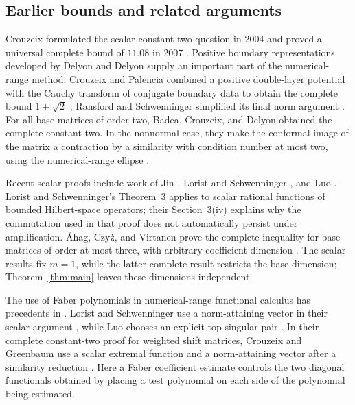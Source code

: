 \documentclass[11pt]{article}
\theoremstyle{remark}\newtheorem{remark}[theorem]{Remark}
\numberwithin{equation}{section}
\begin{document}
\subsection*{Earlier bounds and related arguments}
Crouzeix formulated the scalar constant-two question in 2004 and proved a
universal complete bound of $11.08$ in 2007
\cite{Crouzeix2004,Crouzeix2007}.
Positive boundary representations developed by Delyon and Delyon
\cite{DelyonDelyon1999} supply an important part of the numerical-range
method. Crouzeix and Palencia combined a positive double-layer potential
with the Cauchy transform of conjugate boundary data to obtain the
complete bound $1+\sqrt2$ \cite{CrouzeixPalencia2017}; Ransford and
Schwenninger simplified its final norm argument
\cite{RansfordSchwenninger2018}.
For all base matrices of order two, Badea, Crouzeix, and Delyon obtained
the complete constant two. In the nonnormal case, they make the conformal
image of the matrix a contraction by a similarity with condition number at
most two, using the numerical-range ellipse \cite{BadeaCrouzeixDelyon2006}.

Recent scalar proofs include work of Jin \cite{Jin2026},
Lorist and Schwenninger \cite{LoristSchwenninger2026}, and Luo
\cite{Luo2026}.
Lorist and Schwenninger's Theorem~3 applies to scalar rational functions
of bounded Hilbert-space operators; their Section~3(iv) explains why the
commutation used in that proof does not automatically persist under
amplification. \AA hag, Czy{\.{z}}, and Virtanen prove the complete
inequality for base matrices of order at most three, with arbitrary
coefficient dimension \cite[Theorem~1.1]{AhagCzyzVirtanen2026}.
The scalar results fix $m=1$, while the latter complete result restricts
the base dimension; Theorem~\ref{thm:main} leaves these dimensions independent.

The use of Faber polynomials in numerical-range functional calculus has
precedents in \cite{Beckermann2005,BeckermannCrouzeix2014}.
Lorist and Schwenninger use a norm-attaining vector in their scalar
argument \cite[Lemma~1]{LoristSchwenninger2026}, while Luo chooses an
explicit top singular pair \cite[Section~3, equations~(21)--(22)]{Luo2026}.
In their complete constant-two proof for weighted shift matrices, Crouzeix
and Greenbaum use a scalar extremal function and a norm-attaining vector
after a similarity reduction
\cite[Section~3, proof of Theorem~2]{CrouzeixGreenbaum2025}.
Here a Faber coefficient estimate controls the two diagonal functionals obtained by placing a test
polynomial on each side of the polynomial being estimated.
\end{document}
